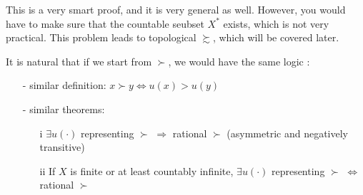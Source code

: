 This is a very smart proof, and it is very general as well. However, you would have to make sure that the countable seubset $X^*$ exists, which is not very practical. This problem leads to topological $\succsim$, which will be covered later.

It is natural that if we start from $\succ$, we would have the same logic \citep[See][Page 30]{kreps1990acourse}:

\begin{enumerate}
    \item[-] similar definition: $x\succ y\Leftrightarrow u(x)>u(y)$
    \item[-] similar theorems: 
    \begin{enumerate}
        \item[i] $\exists u(\cdot)$ representing $\succ$ $\Rightarrow$ rational $\succ$ (asymmetric and negatively transitive)
        \item[ii] If $X$ is finite or at least countably infinite, $\exists u(\cdot)$ representing $\succ$ $\Leftrightarrow$ rational $\succ$
    \end{enumerate} 
\end{enumerate}